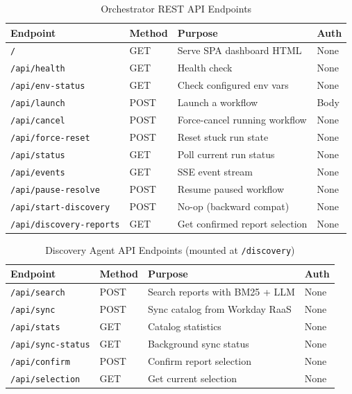 \documentclass[12pt,a4paper]{article}
\begin{document}
\begin{table}[H]
\centering
\caption{Orchestrator REST API Endpoints}
\label{tab:api-endpoints}
\begin{tabularx}{\textwidth}{l l X l}
\toprule
\textbf{Endpoint} & \textbf{Method} & \textbf{Purpose} & \textbf{Auth} \\
\midrule
\texttt{/} & GET & Serve SPA dashboard HTML & None \\
\texttt{/api/health} & GET & Health check & None \\
\texttt{/api/env-status} & GET & Check configured env vars & None \\
\texttt{/api/launch} & POST & Launch a workflow & Body \\
\texttt{/api/cancel} & POST & Force-cancel running workflow & None \\
\texttt{/api/force-reset} & POST & Reset stuck run state & None \\
\texttt{/api/status} & GET & Poll current run status & None \\
\texttt{/api/events} & GET & SSE event stream & None \\
\texttt{/api/pause-resolve} & POST & Resume paused workflow & None \\
\texttt{/api/start-discovery} & POST & No-op (backward compat) & None \\
\texttt{/api/discovery-reports} & GET & Get confirmed report selection & None \\
\bottomrule
\end{tabularx}
\end{table}

\begin{table}[H]
\centering
\caption{Discovery Agent API Endpoints (mounted at \texttt{/discovery})}
\label{tab:discovery-api}
\begin{tabularx}{\textwidth}{l l X l}
\toprule
\textbf{Endpoint} & \textbf{Method} & \textbf{Purpose} & \textbf{Auth} \\
\midrule
\texttt{/api/search} & POST & Search reports with BM25 + LLM & None \\
\texttt{/api/sync} & POST & Sync catalog from Workday RaaS & None \\
\texttt{/api/stats} & GET & Catalog statistics & None \\
\texttt{/api/sync-status} & GET & Background sync status & None \\
\texttt{/api/confirm} & POST & Confirm report selection & None \\
\texttt{/api/selection} & GET & Get current selection & None \\
\bottomrule
\end{tabularx}
\end{table}
\end{document}
